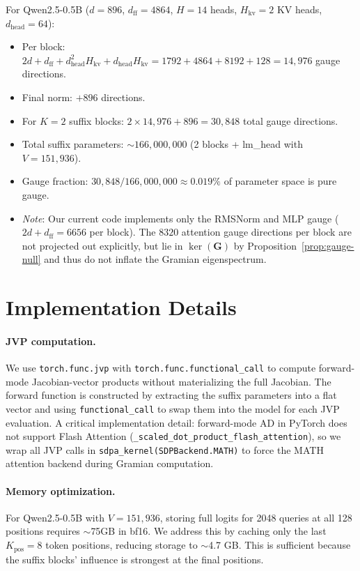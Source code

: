 \documentclass{article}
\newcommand{\bG}{\mathbf{G}}
\begin{document}
For Qwen2.5-0.5B ($d=896$, $d_\text{ff}=4864$, $H=14$ heads, $H_{\text{kv}}=2$ KV heads, $d_\text{head}=64$):
\begin{itemize}
 \item Per block: $2d + d_\text{ff} + d_\text{head}^2 H_{\text{kv}} + d_\text{head} H_{\text{kv}} = 1792 + 4864 + 8192 + 128 = 14{,}976$ gauge directions.
 \item Final norm: $+896$ directions.
 \item For $K=2$ suffix blocks: $2 \times 14{,}976 + 896 = 30{,}848$ total gauge directions.
 \item Total suffix parameters: $\sim 166{,}000{,}000$ (2 blocks + lm\_head with $V = 151{,}936$).
 \item Gauge fraction: $30{,}848 / 166{,}000{,}000 \approx 0.019\%$ of parameter space is pure gauge.
 \item \emph{Note}: Our current code implements only the RMSNorm and MLP gauge ($2d + d_\text{ff} = 6656$ per block). The $8320$ attention gauge directions per block are not projected out explicitly, but lie in $\ker(\bG)$ by Proposition~\ref{prop:gauge-null} and thus do not inflate the Gramian eigenspectrum.
\end{itemize}

\section{Implementation Details}
\label{app:implementation}

\paragraph{JVP computation.}
We use \texttt{torch.func.jvp} with \texttt{torch.func.functional\_call} to compute forward-mode Jacobian-vector products without materializing the full Jacobian. The forward function is constructed by extracting the suffix parameters into a flat vector and using \texttt{functional\_call} to swap them into the model for each JVP evaluation. A critical implementation detail: forward-mode AD in PyTorch does not support Flash Attention (\texttt{\_scaled\_dot\_product\_flash\_attention}), so we wrap all JVP calls in \texttt{sdpa\_kernel(SDPBackend.MATH)} to force the MATH attention backend during Gramian computation.

\paragraph{Memory optimization.}
For Qwen2.5-0.5B with $V = 151{,}936$, storing full logits for 2048 queries at all 128 positions requires $\sim$75GB in bf16. We address this by caching only the last $K_{\text{pos}} = 8$ token positions, reducing storage to $\sim$4.7 GB. This is sufficient because the suffix blocks' influence is strongest at the final positions.
\end{document}
